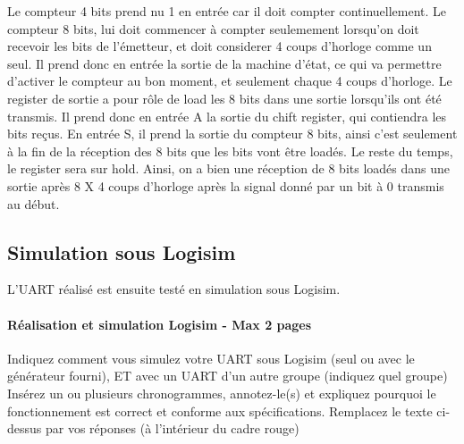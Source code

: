 \documentclass[a4paper]{article} %
\begin{document}
\begin{tcolorbox}[colframe=Monokaimagenta,colback=white]
Le compteur 4 bits prend nu 1 en entrée car il doit compter continuellement. Le compteur 8 bits, lui doit commencer à compter seulemement lorsqu'on doit recevoir les bits de l'émetteur, et doit considerer 4 coups d'horloge comme un seul. Il prend donc en entrée la sortie de la machine d'état, ce qui va permettre d'activer le compteur au bon moment, et seulement chaque 4 coups d'horloge.
Le register de sortie a pour rôle de load les 8 bits dans une sortie lorsqu'ils ont été transmis. Il prend donc en entrée A la sortie du chift register, qui contiendra les bits reçus. En entrée S, il prend la sortie du compteur 8 bits, ainsi c'est seulement à la fin de la réception des 8 bits que les bits vont être loadés. Le reste du temps, le register sera sur hold.
Ainsi, on a bien une réception de 8 bits loadés dans une sortie après 8 X 4 coups d'horloge après la signal donné par un bit à 0 transmis au début.
\\
\end{tcolorbox}
 \subsection{Simulation sous Logisim}
L’UART réalisé est ensuite testé en simulation sous Logisim.
\begin{tcolorbox}[colframe=Monokaimagenta,colback=white]
\paragraph{Réalisation et simulation Logisim - Max 2 pages}
Indiquez comment vous simulez votre UART sous Logisim (seul ou avec le générateur fourni), ET avec un UART d’un autre groupe (indiquez quel groupe)
Insérez un ou plusieurs chronogrammes, annotez-le(s) et expliquez pourquoi le fonctionnement est correct et conforme aux spécifications.
Remplacez le texte ci-dessus par vos réponses (à l’intérieur du cadre rouge)
\\
\end{tcolorbox}
\end{document}
